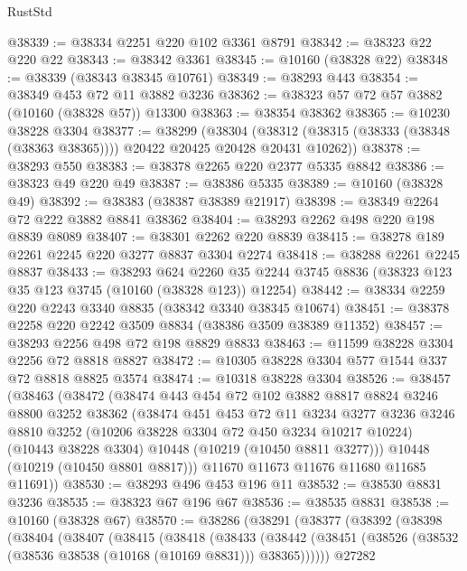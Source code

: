 \begin{lexlean}{RustStd}
\begin{coremodule}
@38339 := @38334 @2251 @220 @102 @3361 @8791
@38342 := @38323 @22 @220 @22
@38343 := @38342 @3361
@38345 := @10160 (@38328 @22)
@38348 := @38339 (@38343 @38345 @10761)
@38349 := @38293 @443
@38354 := @38349 @453 @72 @11 @3882 @3236
@38362 := @38323 @57 @72 @57 @3882 (@10160 (@38328 @57)) @13300
@38363 := @38354 @38362
@38365 := @10230 @38228 @3304
@38377 := @38299
    (@38304 (@38312 (@38315 (@38333 (@38348 (@38363 @38365)))) @20422 @20425 @20428 @20431 @10262))
@38378 := @38293 @550
@38383 := @38378 @2265 @220 @2377 @5335 @8842
@38386 := @38323 @49 @220 @49
@38387 := @38386 @5335
@38389 := @10160 (@38328 @49)
@38392 := @38383 (@38387 @38389 @21917)
@38398 := @38349 @2264 @72 @222 @3882 @8841 @38362
@38404 := @38293 @2262 @498 @220 @198 @8839 @8089
@38407 := @38301 @2262 @220 @8839
@38415 := @38278 @189 @2261 @2245 @220 @3277 @8837 @3304 @2274
@38418 := @38288 @2261 @2245 @8837
@38433 := @38293
    @624
    @2260
    @35
    @2244
    @3745
    @8836
    (@38323 @123 @35 @123 @3745 (@10160 (@38328 @123)) @12254)
@38442 := @38334 @2259 @220 @2243 @3340 @8835 (@38342 @3340 @38345 @10674)
@38451 := @38378 @2258 @220 @2242 @3509 @8834 (@38386 @3509 @38389 @11352)
@38457 := @38293 @2256 @498 @72 @198 @8829 @8833
@38463 := @11599 @38228 @3304 @2256 @72 @8818 @8827
@38472 := @10305 @38228 @3304 @577 @1544 @337 @72 @8818 @8825 @3574
@38474 := @10318 @38228 @3304
@38526 := @38457
    (@38463
      (@38472
        (@38474
          @443
          @454
          @72
          @102
          @3882
          @8817
          @8824
          @3246
          @8800
          @3252
          @38362
          (@38474
            @451
            @453
            @72
            @11
            @3234
            @3277
            @3236
            @3246
            @8810
            @3252
            (@10206 @38228 @3304 @72 @450 @3234 @10217 @10224)
            (@10443 @38228 @3304)
            @10448
            (@10219 (@10450 @8811 @3277)))
          @10448
          (@10219 (@10450 @8801 @8817)))
        @11670
        @11673
        @11676
        @11680
        @11685
        @11691))
@38530 := @38293 @496 @453 @196 @11
@38532 := @38530 @8831 @3236
@38535 := @38323 @67 @196 @67
@38536 := @38535 @8831
@38538 := @10160 (@38328 @67)
@38570 := @38286
    (@38291
      (@38377
        (@38392
          (@38398
            (@38404
              (@38407
                (@38415
                  (@38418
                    (@38433
                      (@38442
                        (@38451 (@38526 (@38532 (@38536 @38538 (@10168 (@10169 @8831))) @38365))))))
                  @27282

\end{coremodule}
\end{lexlean}
